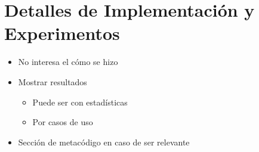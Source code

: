 \chapter{Detalles de Implementación y Experimentos}\label{chapter:implementation}


\begin{itemize}

    \item No interesa el cómo se hizo
    \item Mostrar resultados
    \begin{itemize}

        \item Puede ser con estadísticas
        \item Por casos de uso

    \end{itemize}
    \item Sección de metacódigo en caso de ser relevante

\end{itemize}
